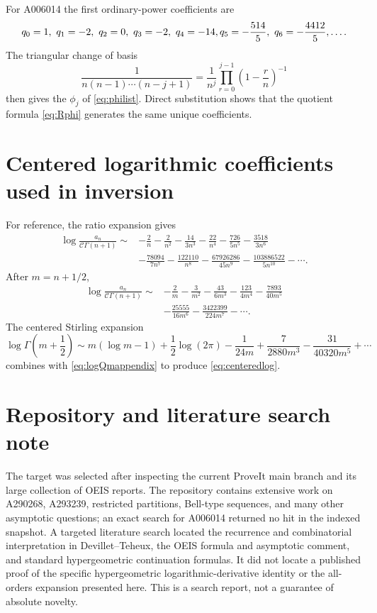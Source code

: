 \documentclass[11pt,a4paper]{article}
\theoremstyle{definition}
\theoremstyle{remark}
\newcommand{\constC}{\mathcal{C}}
\begin{document}
For A006014 the first ordinary-power coefficients are
\[
 q_0=1,\ q_1=-2,\ q_2=0,\ q_3=-2,\ q_4=-14,\\
 q_5=-\frac{514}{5},\ q_6=-\frac{4412}{5},\ldots.
\]
The triangular change of basis
\[
 \frac{1}{n(n-1)\cdots(n-j+1)}
 =\frac{1}{n^j}\prod_{r=0}^{j-1}\left(1-\frac{r}{n}\right)^{-1}
\]
then gives the \(\phi_j\) of \eqref{eq:philist}.  Direct substitution shows that the quotient formula \eqref{eq:Rphi} generates the same unique coefficients.

\section{Centered logarithmic coefficients used in inversion}

For reference, the ratio expansion gives
\begin{equation}\label{eq:logQappendix}
\begin{split}
 \log\frac{a_n}{\constC\Gamma(n+1)}\sim{}&
 -\frac2n-\frac2{n^2}-\frac{14}{3n^3}-\frac{22}{n^4}
 -\frac{726}{5n^5}-\frac{3518}{3n^6}\\
 &-\frac{78094}{7n^7}-\frac{122110}{n^8}
 -\frac{67926286}{45n^9}-\frac{103886522}{5n^{10}}-\cdots.
\end{split}
\end{equation}
After \(m=n+1/2\),
\begin{equation}\label{eq:logQmappendix}
\begin{split}
 \log\frac{a_n}{\constC\Gamma(n+1)}\sim{}&
 -\frac2m-\frac3{m^2}-\frac{43}{6m^3}-\frac{123}{4m^4}
 -\frac{7893}{40m^5}\\
 &-\frac{25555}{16m^6}-\frac{3422399}{224m^7}-\cdots.
\end{split}
\end{equation}
The centered Stirling expansion
\[
 \log\Gamma\left(m+\frac12\right)
 \sim m(\log m-1)+\frac12\log(2\pi)
 -\frac{1}{24m}+\frac{7}{2880m^3}
 -\frac{31}{40320m^5}+\cdots
\]
combines with \eqref{eq:logQmappendix} to produce \eqref{eq:centeredlog}.

\section{Repository and literature search note}

The target was selected after inspecting the current ProveIt main branch and its large collection of OEIS reports.  The repository contains extensive work on A290268, A293239, restricted partitions, Bell-type sequences, and many other asymptotic questions; an exact search for A006014 returned no hit in the indexed snapshot.  A targeted literature search located the recurrence and combinatorial interpretation in Devillet--Teheux, the OEIS formula and asymptotic comment, and standard hypergeometric continuation formulas.  It did not locate a published proof of the specific hypergeometric logarithmic-derivative identity or the all-orders expansion presented here.  This is a search report, not a guarantee of absolute novelty.
\end{document}
